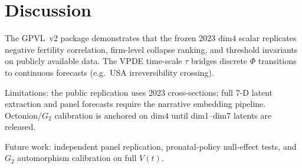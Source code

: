 \section{Discussion}
\label{sec:discussion}

The GPVL~v2 package demonstrates that the frozen 2023 $\mathrm{dim4}$ scalar
replicates negative fertility correlation, firm-level collapse ranking, and
threshold invariants on publicly available data. The VPDE time-scale $\tau$
bridges discrete $\Phi$ transitions to continuous forecasts (e.g.\ USA
irreversibility crossing).

Limitations: the public replication uses 2023 cross-sections; full 7-D latent
extraction and panel forecasts require the narrative embedding pipeline.
Octonion/$G_2$ calibration is anchored on $\mathrm{dim4}$ until dim1--dim7
latents are released.

Future work: independent panel replication, pronatal-policy null-effect tests,
and $G_2$ automorphism calibration on full $V(t)$.
